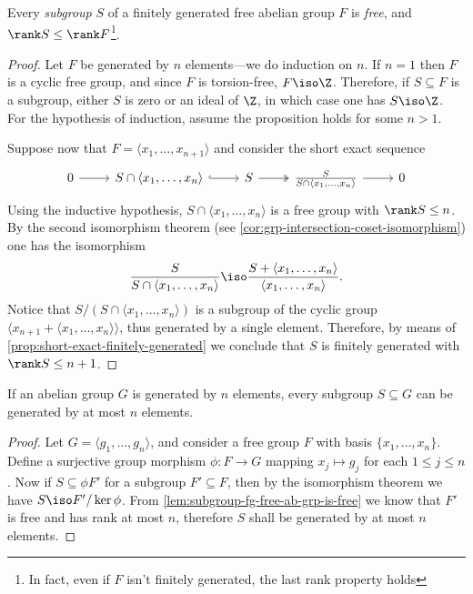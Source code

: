 \begin{lemma}
\label{lem:subgroup-fg-free-ab-grp-is-free}
Every \emph{subgroup} \(S\) of a finitely generated free abelian group \(F\) is
\emph{free}, and \(\rank S \leq \rank F\)\footnote{In fact, even if \(F\) isn't
finitely generated, the last rank property holds}.
\end{lemma}

\begin{proof}
Let \(F\) be generated by \(n\) elements---we do induction on \(n\). If
\(n = 1\) then \(F\) is a cyclic free group, and since \(F\) is torsion-free,
\(F \iso \Z\). Therefore, if \(S \subseteq F\) is a subgroup, either \(S\) is
zero or an ideal of \(\Z\), in which case one has \(S \iso \Z\). For the
hypothesis of induction, assume the proposition holds for some \(n > 1\).

Suppose now that \(F = \langle x_1, \dots, x_{n+1} \rangle\) and consider the
short exact sequence
\[
\begin{tikzcd}
0 \ar[r]
&S \cap \langle x_1, \dots, x_n \rangle \ar[r, hook]
&S \ar[r, two heads]
&\frac{S}{S \cap \langle x_1, \dots, x_n \rangle} \ar[r]
&0
\end{tikzcd}
\]
Using the inductive hypothesis, \(S \cap \langle x_1, \dots, x_n \rangle\) is a
free group with \(\rank S \leq n\). By the second isomorphism theorem (see
\cref{cor:grp-intersection-coset-isomorphism}) one has the isomorphism
\[
\frac{S}{S \cap \langle x_1, \dots, x_n \rangle}
\iso
\frac{S + \langle x_1, \dots, x_n \rangle}{\langle x_1, \dots, x_n \rangle}.
\]
Notice that \(S/(S \cap \langle x_1, \dots, x_n \rangle)\) is a subgroup of the
cyclic group \(\langle x_{n+1} + \langle x_1, \dots, x_n \rangle \rangle\), thus
generated by a single element. Therefore, by means of
\cref{prop:short-exact-finitely-generated} we conclude that \(S\) is finitely
generated with \(\rank S \leq n + 1\).
\end{proof}

\begin{corollary}
\label{cor:subgroup-fg-is-fg}
If an abelian group \(G\) is generated by \(n\) elements, every subgroup
\(S \subseteq G\) can be generated by at most \(n\) elements.
\end{corollary}

\begin{proof}
Let \(G = \langle g_1, \dots, g_n \rangle\), and consider a free group \(F\)
with basis \(\{x_1, \dots, x_n\}\). Define a surjective group morphism
\(\phi: F \to G\) mapping \(x_j \mapsto g_j\) for each \(1 \leq j \leq n\). Now
if \(S \subseteq \phi F'\) for a subgroup \(F' \subseteq F\), then by the
isomorphism theorem we have \(S \iso F'/\ker \phi\). From
\cref{lem:subgroup-fg-free-ab-grp-is-free} we know that \(F'\) is free and has
rank at most \(n\), therefore \(S\) shall be generated by at most \(n\)
elements.
\end{proof}

